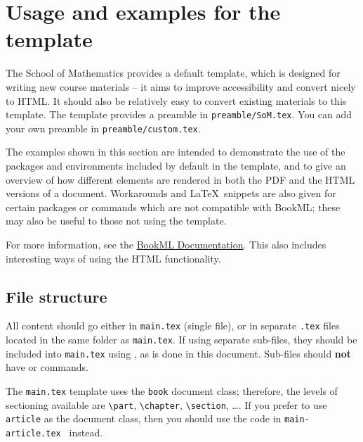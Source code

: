 \chapter{Usage and examples for the template}
\label{demo}

The School of Mathematics provides a default template, which is designed for writing new course materials -- it aims to improve accessibility and convert nicely to HTML. It should also be relatively easy to convert existing materials to this template. The template provides a preamble in \texttt{preamble/SoM.tex}. You can add your own preamble in \texttt{preamble/custom.tex}.

The examples shown in this section are intended to demonstrate the use of the packages and environments included by default in the template, and to give an overview of how different elements are rendered in both the PDF and the HTML versions of a document. Workarounds and \LaTeX\ snippets are also given for certain packages or commands which are not compatible with BookML; these may also be useful to those not using the template.

For more information, see the \href{https://vlmantova.github.io/bookml/#S3.SS1}{BookML Documentation}. This also includes interesting ways of using the HTML functionality.

\section{File structure}
\label{demo:struct}


All content should go either in \texttt{main.tex} (single file), or in separate \texttt{.tex} files located in the same folder as \texttt{main.tex}. If using separate sub-files, they should be included into \texttt{main.tex} using \verb||, as is done in this document. Sub-files should \textbf{not} have \verb|| or \verb|| commands.

The \texttt{main.tex} template uses the \texttt{book} document class; therefore, the levels of sectioning available are \verb|\part|, \verb|\chapter|, \verb|\section|, \ldots. If you prefer to use \texttt{article} as the document class, then you should use the code in \texttt{main-article.tex~} instead.

